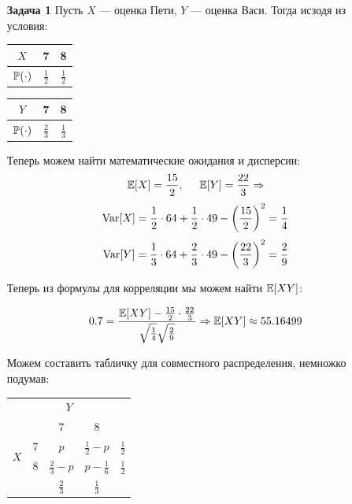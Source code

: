 \documentclass[12pt, a4paper]{article}\usepackage[]{graphicx}\usepackage[]{color}
\begin{document}
				\begin{enumerate}
					\item[\textbf{Задача 1}]
					Пусть $X$ — оценка Пети, $Y$ — оценка Васи. Тогда исзодя из условия:
					\begin{center}

						\begin{tabular}{c|c|c}
							$X$ & 7 & 8\\
							\hline
							$\P(\cdot)$ & $\frac{1}{2}$ & $\frac{1}{2}$
						\end{tabular}
						\hspace{1cm}
						\begin{tabular}{c|c|c}
							$Y$ & 7 & 8\\
							\hline
							$\P(\cdot)$ & $\frac{2}{3}$ & $\frac{1}{3}$
						\end{tabular}
					\end{center}

					Теперь можем найти математические ожидания и дисперсии:
					$$
					\E[X] = \frac{15}{2}, \hspace{0.5cm} \E[Y] = \frac{22}{3} \Rightarrow
					$$
					$$
					\Var[X] = \frac{1}{2}\cdot 64 + \frac{1}{2}\cdot 49 - \left(\frac{15}{2}\right)^2 = \frac{1}{4}
					$$
					$$
					\Var[Y] = \frac{1}{3}\cdot 64 + \frac{2}{3}\cdot 49 - \left(\frac{22}{3}\right)^2 = \frac{2}{9}
					$$

					Теперь из формулы для корреляции мы можем найти $\E[XY]$:

					$$
					0.7 = \frac{\E[XY]-\frac{15}{2}\cdot\frac{22}{3}}{\sqrt{\frac{1}{4}}\sqrt{\frac{2}{9}}} \Rightarrow \E[XY] \approx 55.16499
					$$

					Можем составить табличку для совместного распределения, немножко подумав:

					\begin{center}
						\begin{tabular}{c|c|c|c|c|}
							\multicolumn{5}{c}{\hspace*{1cm}$Y$}\\
							\cline{2-5}
							\multirow{4}{*}{$X$}  & &  7 & 8 &  \\
							\cline{2-5}
							& 7 & $p$ & $\frac{1}{2}-p$&$\frac{1}{2}$\\
							\cline{2-5}
							& 8  & $\frac{2}{3}-p$&$p-\frac{1}{6}$ & $\frac{1}{2}$\\
							\cline{2-5}
							& & $\frac{2}{3}$ & $\frac{1}{3}$& \\
							\cline{2-5}


\end{tabular}
\end{center}
\end{enumerate}
\end{document}
